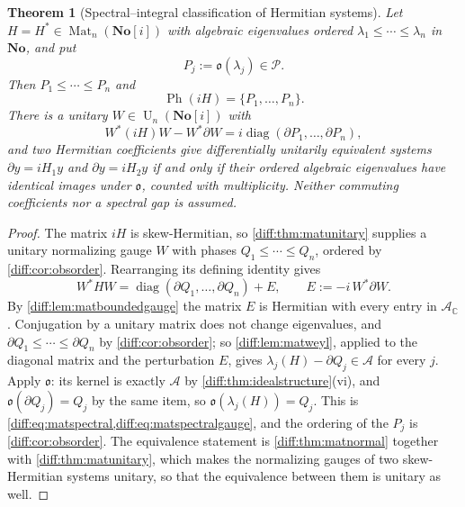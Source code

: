 \documentclass[11pt,letterpaper]{article}
\numberwithin{equation}{section}
\newtheorem{theorem}{Theorem}[section]
\theoremstyle{definition}
\theoremstyle{remark}
\newcommand{\No}{\mathbf{No}}
\newcommand{\SC}{\mathbf{No}[i]}
\newcommand{\C}{\mathbb C}
\newcommand{\der}{\partial}
\newcommand{\Pcl}{\mathcal P}
\newcommand{\Acl}{\mathcal A}
\newcommand{\Obs}{\mathfrak o}
\newcommand{\Mat}{\operatorname{Mat}}
\newcommand{\Un}{\operatorname{U}}
\newcommand{\Ph}{\operatorname{Ph}}
\begin{document}
\begin{theorem}[Spectral--integral classification of Hermitian systems]
\label{diff:thm:matspectral}
Let $H=H^{*}\in\Mat_{n}(\SC)$ with algebraic eigenvalues ordered
$\lambda_{1}\leq\cdots\leq\lambda_{n}$ in $\No$, and put
\[
 P_{j}:=\Obs(\lambda_{j})\in\Pcl .
\]
Then $P_{1}\leq\cdots\leq P_{n}$ and
\begin{equation}\label{diff:eq:matspectral}
 \Ph(iH)=\{P_{1},\dots,P_{n}\} .
\end{equation}
There is a unitary $W\in\Un_{n}(\SC)$ with
\begin{equation}\label{diff:eq:matspectralgauge}
 W^{*}(iH)W-W^{*}\der W
   =i\operatorname{diag}(\der P_{1},\dots,\der P_{n}),
\end{equation}
and two Hermitian coefficients give differentially unitarily equivalent
systems $\der y=iH_{1}y$ and $\der y=iH_{2}y$ if and only if their ordered
algebraic eigenvalues have identical images under $\Obs$, counted with
multiplicity. Neither commuting coefficients nor a spectral gap is assumed.
\end{theorem}
\begin{proof}
The matrix $iH$ is skew-Hermitian, so \cref{diff:thm:matunitary} supplies a
unitary normalizing gauge $W$ with phases $Q_{1}\leq\cdots\leq Q_{n}$, ordered
by \cref{diff:cor:obsorder}. Rearranging its defining identity gives
\begin{equation}\label{diff:eq:matspectralproof}
 W^{*}HW=\operatorname{diag}(\der Q_{1},\dots,\der Q_{n})
        +E,\qquad E:=-i\,W^{*}\der W .
\end{equation}
By \cref{diff:lem:matboundedgauge} the matrix $E$ is Hermitian with every
entry in $\Acl_{\C}$. Conjugation by a unitary matrix does not change
eigenvalues, and $\der Q_{1}\leq\cdots\leq\der Q_{n}$ by
\cref{diff:cor:obsorder}; so \cref{diff:lem:matweyl}, applied to the diagonal
matrix and the perturbation $E$, gives
$\lambda_{j}(H)-\der Q_{j}\in\Acl$ for every $j$. Apply $\Obs$: its kernel is
exactly $\Acl$ by \cref{diff:thm:idealstructure}(vi), and
$\Obs(\der Q_{j})=Q_{j}$ by the same item, so
$\Obs(\lambda_{j}(H))=Q_{j}$. This is
\cref{diff:eq:matspectral,diff:eq:matspectralgauge}, and the ordering of the
$P_{j}$ is \cref{diff:cor:obsorder}. The equivalence statement is
\cref{diff:thm:matnormal} together with \cref{diff:thm:matunitary}, which makes
the normalizing gauges of two skew-Hermitian systems unitary, so that the
equivalence between them is unitary as well.
\end{proof}
\end{document}
